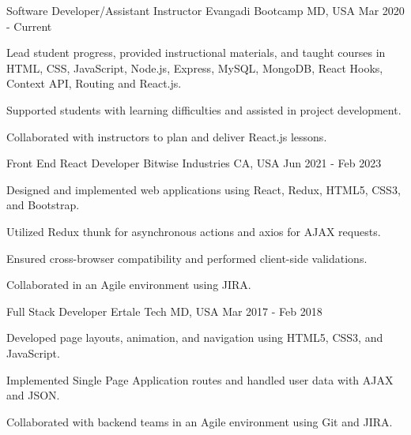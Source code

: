 

\begin{cventries}

  \cventry
    {Software Developer/Assistant Instructor} %
    {Evangadi Bootcamp} %
    {MD, USA} %
    {Mar 2020 - Current} %
    {
      \begin{cvitems} %
        \item {Lead student progress, provided instructional materials, and taught courses in HTML, CSS, JavaScript, Node.js, Express, MySQL, MongoDB, React Hooks, Context API, Routing and React.js.}
        \item {Supported students with learning difficulties and assisted in project development.}
        \item {Collaborated with instructors to plan and deliver React.js lessons.}
      \end{cvitems}
    }

  \cventry
    {Front End React Developer} %
    {Bitwise Industries} %
    {CA, USA} %
    {Jun 2021 - Feb 2023} %
    {
      \begin{cvitems} %
        \item {Designed and implemented web applications using React, Redux, HTML5, CSS3, and Bootstrap.}
        \item {Utilized Redux thunk for asynchronous actions and axios for AJAX requests.}
        \item {Ensured cross-browser compatibility and performed client-side validations.}
        \item {Collaborated in an Agile environment using JIRA.}
      \end{cvitems}
    }

  \cventry
    {Full Stack Developer} %
    {Ertale Tech} %
    {MD, USA} %
    {Mar 2017 - Feb 2018} %
    {
      \begin{cvitems} %
        \item {Developed page layouts, animation, and navigation using HTML5, CSS3, and JavaScript.}
        \item {Implemented Single Page Application routes and handled user data with AJAX and JSON.}
        \item {Collaborated with backend teams in an Agile environment using Git and JIRA.}
      \end{cvitems}
    }

\end{cventries}

